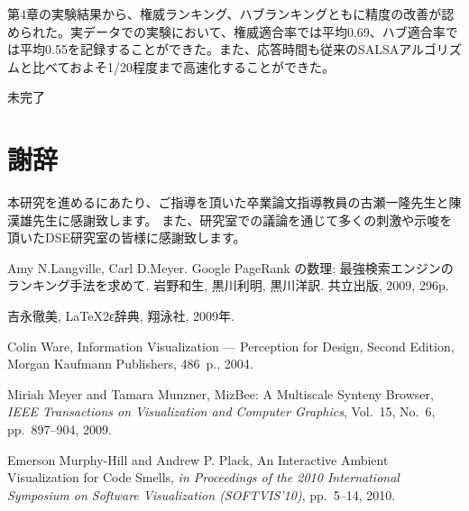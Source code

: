 \documentclass[a4paper,11pt]{jreport}
\begin{document}
第4章の実験結果から、権威ランキング、ハブランキングともに精度の改善が認められた。実データでの実験において、権威適合率では平均0.69、ハブ適合率では平均0.55を記録することができた。また、応答時間も従来のSALSAアルゴリズムと比べておよそ1/20程度まで高速化することができた。


未完了



\chapter*{謝辞}

本研究を進めるにあたり、ご指導を頂いた卒業論文指導教員の古瀬一隆先生と陳漢雄先生に感謝致します。
また、研究室での議論を通じて多くの刺激や示唆を頂いたDSE研究室の皆様に感謝致します。

\newpage


\renewcommand{\bibname}{参考文献}

%
%

\begin{thebibliography}{1}
Amy N.Langville, Carl D.Meyer. Google PageRank の数理: 最強検索エンジンの ランキング手法を求めて. 岩野和生, 黒川利明, 黒川洋訳. 共立出版, 2009, 296p.

吉永徹美, LaTeX2ε辞典, 翔泳社, 2009年.

Colin Ware, Information Visualization --- Perception for Design, Second Edition, Morgan Kaufmann Publishers, 486~p., 2004.

Miriah Meyer and Tamara Munzner, MizBee: A Multiscale Synteny Browser, {\em IEEE Transactions on Visualization and Computer Graphics}, Vol.~15, No.~6, pp.~897--904, 2009.

Emerson Murphy-Hill and Andrew P. Plack, An Interactive Ambient Visualization for Code Smells, {\em in Proceedings of the 2010 International Symposium on Software Visualization (SOFTVIS’10)}, pp.~5--14, 2010.

\end{thebibliography}
\end{document}

